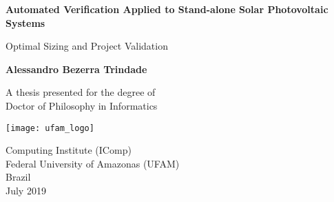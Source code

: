 \begin{titlepage}
    \begin{center}
        \vspace*{1cm}
        
        \Huge
        \textbf{Automated Verification Applied to Stand-alone Solar Photovoltaic Systems}
        
        \vspace{0.5cm}
        \LARGE
        Optimal Sizing and Project Validation
        
        \vspace{1.5cm}
        
        \textbf{Alessandro Bezerra Trindade}
        
        \vfill
        
        A thesis presented for the degree of\\
        Doctor of Philosophy in Informatics
        
        \vspace{0.8cm}
        
        \texttt{[image: ufam\_logo]}
        
        \Large
        Computing Institute (IComp)\\
        Federal University of Amazonas (UFAM)\\
        Brazil\\
        July 2019
        
    \end{center}
\end{titlepage}